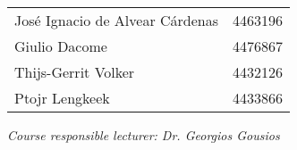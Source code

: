 \begin{titlepage}
\begin{center}
\begin{table}[htb]
\centering
\label{team}
\begin{tabular}{ll}
Jos\'e Ignacio de Alvear C\'ardenas & 4463196 \\
Giulio Dacome   & 4476867 \\
Thijs-Gerrit Volker    & 4432126 \\
Ptojr Lengkeek   & 4433866 \\ 

                          
\end{tabular}
\end{table}

\emph{Course responsible lecturer: Dr. Georgios Gousios}

\bigskip
\bigskip

\end{center}

\end{titlepage}